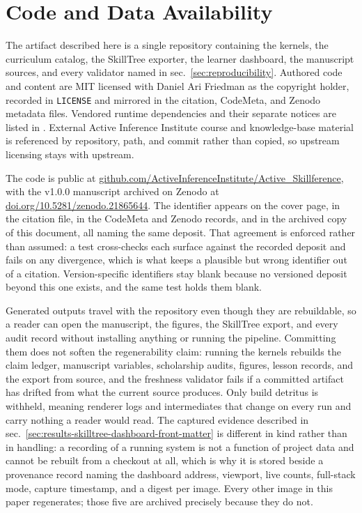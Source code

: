 \documentclass[
  english,
]{article}
\begin{document}
\newpage

\section{Code and Data
Availability}\label{sec:code-and-data-availability}

The artifact described here is a single repository containing the
kernels, the curriculum catalog, the SkillTree exporter, the learner
dashboard, the manuscript sources, and every validator named in
sec.~\ref{sec:reproducibility}. Authored code and content are MIT
licensed with Daniel Ari Friedman as the copyright holder, recorded in
\texttt{LICENSE} and mirrored in the citation, CodeMeta, and Zenodo
metadata files. Vendored runtime dependencies and their separate notices
are listed in . External Active
Inference Institute course and knowledge-base material is referenced by
repository, path, and commit rather than copied, so upstream licensing
stays with upstream.

The code is public at
\href{https://github.com/ActiveInferenceInstitute/Active_Skillference}{github.com/ActiveInferenceInstitute/Active\_Skillference},
with the v1.0.0 manuscript archived on Zenodo at
\href{https://doi.org/10.5281/zenodo.21865644}{doi.org/10.5281/zenodo.21865644}.
The identifier appears on the cover page, in the citation file, in the
CodeMeta and Zenodo records, and in the archived copy of this document,
all naming the same deposit. That agreement is enforced rather than
assumed: a test cross-checks each surface against the recorded deposit
and fails on any divergence, which is what keeps a plausible but wrong
identifier out of a citation. Version-specific identifiers stay blank
because no versioned deposit beyond this one exists, and the same test
holds them blank.

Generated outputs travel with the repository even though they are
rebuildable, so a reader can open the manuscript, the figures, the
SkillTree export, and every audit record without installing anything or
running the pipeline. Committing them does not soften the regenerability
claim: running the kernels rebuilds the claim ledger, manuscript
variables, scholarship audits, figures, lesson records, and the export
from source, and the freshness validator fails if a committed artifact
has drifted from what the current source produces. Only build detritus
is withheld, meaning renderer logs and intermediates that change on
every run and carry nothing a reader would read. The captured evidence
described in sec.~\ref{sec:results-skilltree-dashboard-front-matter} is
different in kind rather than in handling: a recording of a running
system is not a function of project data and cannot be rebuilt from a
checkout at all, which is why it is stored beside a provenance record
naming the dashboard address, viewport, live counts, full-stack mode,
capture timestamp, and a digest per image. Every other image in this
paper regenerates; those five are archived precisely because they do
not.
\end{document}
